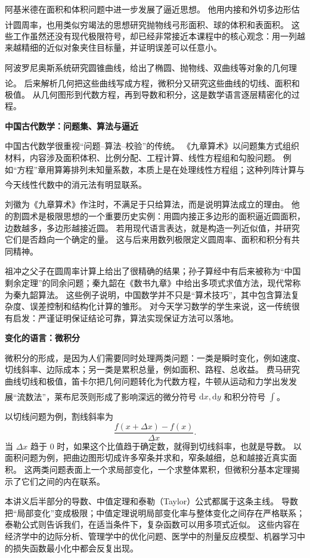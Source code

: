 \documentclass[fontset=fandol]{ctexart}
\newcommand{\dd}{\mathrm{d}}
\newcommand{\upcite}[1]{\textsuperscript{\textsuperscript{\cite{#1}}}}
\begin{document}
阿基米德在面积和体积问题中进一步发展了逼近思想。 他用内接和外切多边形估计圆周率，也用类似穷竭法的思想研究抛物线弓形面积、球的体积和表面积。\upcite{MacTutorGreek} 这些工作虽然还没有现代极限符号，却已经非常接近本课程中的核心观念：用一列越来越精细的近似对象夹住目标量，并证明误差可以任意小。

阿波罗尼奥斯系统研究圆锥曲线，给出了椭圆、抛物线、双曲线等对象的几何理论。\upcite{MacTutorGreek} 后来解析几何把这些曲线写成方程，微积分又研究这些曲线的切线、面积和极值。 从几何图形到代数方程，再到导数和积分，这是数学语言逐层精密化的过程。

\textbf{中国古代数学：问题集、算法与逼近}

中国古代数学很重视“问题--算法--校验”的传统。 《九章算术》以问题集方式组织材料，内容涉及面积体积、比例分配、工程计算、线性方程组和勾股问题。 例如“方程”章用算筹排列未知量系数，本质上是在处理线性方程组；这种列阵计算与今天线性代数中的消元法有明显联系。\upcite{MacTutorChinese}

刘徽为《九章算术》作注时，不满足于只给算法，而是说明算法成立的理由。 他的割圆术是极限思想的一个重要历史实例：用圆内接正多边形的面积逼近圆面积，边数越多，多边形越接近圆。 若用现代语言表达，就是构造一列近似值，并研究它们是否趋向一个确定的量。 这与后来用数列极限定义圆周率、面积和积分有共同精神。

祖冲之父子在圆周率计算上给出了很精确的结果；孙子算经中有后来被称为“中国剩余定理”的同余问题；秦九韶在《数书九章》中给出多项式求值方法，现代常称为秦九韶算法。 这些例子说明，中国数学并不只是“算术技巧”，其中包含算法复杂度、误差控制和结构化计算的雏形。 对今天学习数学的学生来说，这一传统很有启发：严谨证明保证结论可靠，算法实现保证方法可以落地。

\textbf{变化的语言：微积分}

微积分的形成，是因为人们需要同时处理两类问题：一类是瞬时变化，例如速度、切线斜率、边际成本；另一类是累积总量，例如面积、路程、总收益。 费马研究曲线切线和极值，笛卡尔把几何问题转化为代数方程，牛顿从运动和力学出发发展“流数法”，莱布尼茨则形成了影响深远的微分符号 $\dd x,\dd y$ 和积分符号 $\int$。\upcite{MacTutorCalculus}

以切线问题为例，割线斜率为
\[
\frac{f(x+\Delta x)-f(x)}{\Delta x}.
\]
当 $\Delta x$ 趋于 $0$ 时，如果这个比值趋于确定数，就得到切线斜率，也就是导数。 以面积问题为例，把曲边图形切成许多窄条并求和，窄条越细，总和越接近真实面积。 这两类问题表面上一个求局部变化，一个求整体累积，但微积分基本定理揭示了它们之间的内在联系。

本讲义后半部分的导数、中值定理和泰勒（Taylor）公式都属于这条主线。 导数把“局部变化”变成极限；中值定理说明局部变化率与整体变化之间存在严格联系；泰勒公式则告诉我们，在适当条件下，复杂函数可以用多项式近似。 这些内容在经济学中的边际分析、管理学中的优化问题、医学中的剂量反应模型、机器学习中的损失函数最小化中都会反复出现。
\end{document}
